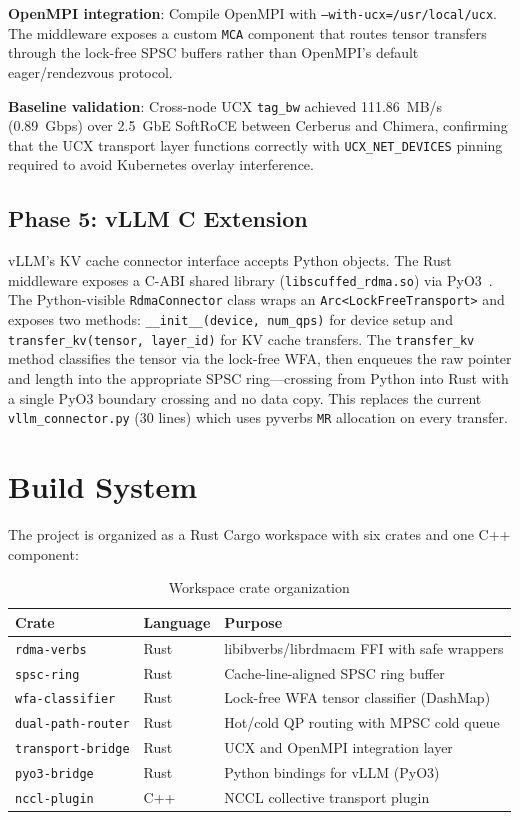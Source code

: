 \documentclass[11pt,letterpaper]{article}
\begin{document}
\textbf{OpenMPI integration}: Compile OpenMPI with \texttt{--with-ucx=/usr/local/ucx}. The middleware exposes a custom \texttt{MCA} component that routes tensor transfers through the lock-free SPSC buffers rather than OpenMPI's default eager/rendezvous protocol.

\textbf{Baseline validation}: Cross-node UCX \texttt{tag\_bw} achieved 111.86~MB/s (0.89~Gbps) over 2.5~GbE SoftRoCE between Cerberus and Chimera, confirming that the UCX transport layer functions correctly with \texttt{UCX\_NET\_DEVICES} pinning required to avoid Kubernetes overlay interference.

\subsection{Phase 5: vLLM C Extension}

vLLM's KV cache connector interface accepts Python objects. The Rust middleware exposes a C-ABI shared library (\texttt{libscuffed\_rdma.so}) via PyO3~\cite{pyo3}. The Python-visible \texttt{RdmaConnector} class wraps an \texttt{Arc<LockFreeTransport>} and exposes two methods: \texttt{\_\_init\_\_(device, num\_qps)} for device setup and \texttt{transfer\_kv(tensor, layer\_id)} for KV cache transfers. The \texttt{transfer\_kv} method classifies the tensor via the lock-free WFA, then enqueues the raw pointer and length into the appropriate SPSC ring---crossing from Python into Rust with a single PyO3 boundary crossing and no data copy. This replaces the current \texttt{vllm\_connector.py} (30 lines) which uses pyverbs \texttt{MR} allocation on every transfer.

\section{Build System}

The project is organized as a Rust Cargo workspace with six crates and one C++ component:

\begin{table}[htbp]
\centering
\caption{Workspace crate organization}
\label{tab:workspace-crates}
\begin{tabular}{@{}llp{6.5cm}@{}}
\toprule
\textbf{Crate} & \textbf{Language} & \textbf{Purpose} \\
\midrule
\texttt{rdma-verbs} & Rust & libibverbs/librdmacm FFI with safe wrappers \\
\texttt{spsc-ring} & Rust & Cache-line-aligned SPSC ring buffer \\
\texttt{wfa-classifier} & Rust & Lock-free WFA tensor classifier (DashMap) \\
\texttt{dual-path-router} & Rust & Hot/cold QP routing with MPSC cold queue \\
\texttt{transport-bridge} & Rust & UCX and OpenMPI integration layer \\
\texttt{pyo3-bridge} & Rust & Python bindings for vLLM (PyO3) \\
\texttt{nccl-plugin} & C++ & NCCL collective transport plugin \\
\bottomrule
\end{tabular}
\end{table}
\end{document}
